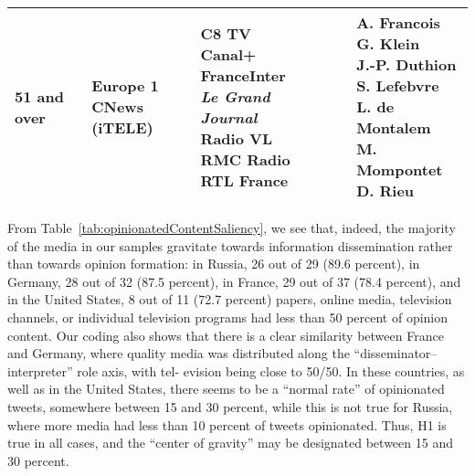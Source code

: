 \begin{table}[ht]
\begin{adjustbox}{width=1\textwidth}
\begin{tabular}{ l  l  l  l  l  l }
			51 and over & \makecell[l]{Europe 1\\CNews (iTELE)} & \makecell[l]{C8 TV\\Canal+\\FranceInter\\\textit{Le Grand Journal}\\Radio VL\\RMC Radio\\RTL France} & & & \makecell[l]{A. Francois\\G. Klein\\J.-P. Duthion\\S. Lefebvre\\L. de Montalem\\M. Mompontet\\D. Rieu}\\
			\hline
		\end{tabular}%
	\end{adjustbox}
\end{table}

From Table~\cref{tab:opinionatedContentSaliency}, we see that, indeed, the majority of the media in our samples gravitate towards information dissemination rather than towards opinion formation: in Russia, 26 out of 29 (89.6 percent), in Germany, 28 out of 32 (87.5 percent), in France, 29 out of 37 (78.4 percent), and in the United States, 8 out of 11 (72.7 percent) papers, online media, television channels, or individual television programs had less than 50 percent of opinion content. Our coding also shows that there is a clear similarity between France and Germany, where quality media was distributed along the “disseminator–interpreter” role axis, with tel- evision being close to 50/50. In these countries, as well as in the United States, there seems to be a “normal rate” of opinionated tweets, somewhere between 15 and 30 percent, while this is not true for Russia, where more media had less than 10 percent of tweets opinionated. Thus, H1 is true in all cases, and the “center of gravity” may be designated between 15 and 30 percent.

